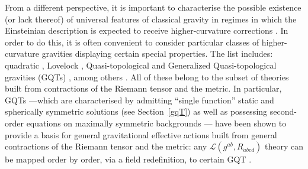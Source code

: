 \documentclass[11pt]{article}
\begin{document}
From a different perspective, it is important to characterise the possible existence (or lack thereof) of universal features of classical gravity in regimes in which the Einsteinian description is expected to receive higher-curvature corrections \cite{PabloPablo4,Arciniega:2018tnn}. In order to do this, it is often convenient to consider particular classes of higher-curvature gravities displaying certain special properties. The list includes:  quadratic \cite{Alvarez-Gaume:2015rwa,Lu:2015cqa}, Lovelock \cite{Lovelock1,Lovelock2,Boulware:1985wk,Padmanabhan:2013xyr}, Quasi-topological \cite{Quasi2,Quasi,Dehghani:2011vu,Ahmed:2017jod,Cisterna:2017umf} and Generalized Quasi-topological gravities (GQTs) \cite{Hennigar:2017ego,PabloPablo3,Bueno:2022res,Moreno:2023rfl}, among others \cite{Lu,Karasu:2016ifk,Li:2017ncu,Bueno:2016dol}. All of these belong to the subset of theories built from contractions of the Riemann tensor and the metric. In particular, GQTs ---which are characterised by admitting ``single function'' static and spherically symmetric solutions (see Section~\ref{gqT}) as well as possessing second-order equations  on maximally symmetric backgrounds ---  have been shown to provide a basis for general gravitational effective actions built from general contractions of the Riemann tensor and the metric: any $\mathcal{L}(g^{ab},R_{abcd})$ theory can be mapped order by order, via a field redefinition, to certain GQT \cite{Bueno:2019ltp}.  
\end{document}
